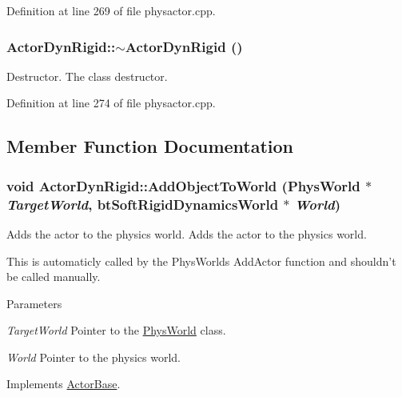 Definition at line 269 of file physactor.cpp.\hypertarget{classActorDynRigid_a3a5504a2ce11f1e95d29a6e431c0c2aa}{
\subsubsection[{$\sim$ActorDynRigid}]{\setlength{\rightskip}{0pt plus 5cm}ActorDynRigid::$\sim$ActorDynRigid ()}}
\label{d4/d0e/classActorDynRigid_a3a5504a2ce11f1e95d29a6e431c0c2aa}


Destructor. The class destructor. 

Definition at line 274 of file physactor.cpp.

\subsection{Member Function Documentation}
\hypertarget{classActorDynRigid_a45c054918362b86d829398384e316ed8}{
\subsubsection[{AddObjectToWorld}]{\setlength{\rightskip}{0pt plus 5cm}void ActorDynRigid::AddObjectToWorld ({\bf PhysWorld} $\ast$ {\em TargetWorld}, \/  btSoftRigidDynamicsWorld $\ast$ {\em World})}}
\label{d4/d0e/classActorDynRigid_a45c054918362b86d829398384e316ed8}


Adds the actor to the physics world. Adds the actor to the physics world. \par
 This is automaticly called by the PhysWorlds AddActor function and shouldn't be called manually. 
\begin{DoxyParams}{Parameters}
\item[{\em TargetWorld}]Pointer to the \hyperlink{classPhysWorld}{PhysWorld} class. \item[{\em World}]Pointer to the physics world. \end{DoxyParams}


Implements \hyperlink{classActorBase_a1af82a2ed960fd114518fdf84d5ff146}{ActorBase}.

